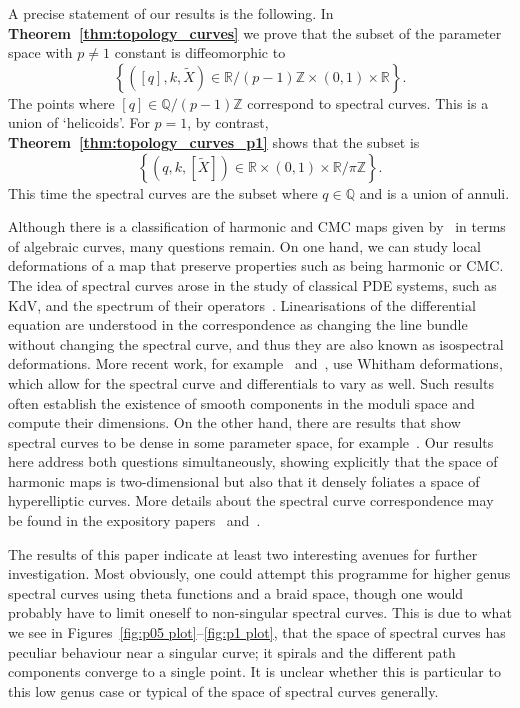 \documentclass{article}
\numberwithin{equation}{section}
\numberwithin{figure}{section}
\newcommand{\bra}[1]{\left(#1\right)}
\newcommand{\Z}{\mathbb{Z}}
\newcommand{\Q}{\mathbb{Q}}
\newcommand{\R}{\mathbb{R}}
\begin{document}
A precise statement of our results is the following. In {\bf Theorem~\ref{thm:topology_curves}} we prove that the subset of the parameter space with $p\neq 1$ constant is diffeomorphic to 
\[
\left\{ \bra{[q],k,\tilde{X}} \in \R/(p-1)\Z \times (0,1) \times \R \right\}.
\]
The points where $[q] \in \Q/(p-1)\Z$ correspond to spectral curves. This is a union of `helicoids'.
For $p=1$, by contrast, {\bf Theorem~\ref{thm:topology_curves_p1}} shows that the subset is 
\[
\left\{ \bra{q,k,\left[\tilde{X}\right]} \in \R \times (0,1) \times \R/\pi\Z \right\}.
\]
This time the spectral curves are the subset where $q\in\Q$ and is a union of annuli.




Although there is a classification of harmonic and CMC maps given by~\cite{Hitchin1990,Pinkall1989,Bobenko1991} in terms of algebraic curves, many questions remain. 
On one hand, we can study local deformations of a map that preserve properties such as being harmonic or CMC. The idea of spectral curves arose in the study of classical PDE systems, such as KdV, and the spectrum of their operators~\cite{Flaschka1980,Krichever1995}. Linearisations of the differential equation are understood in the correspondence as changing the line bundle without changing the spectral curve, and thus they are also known as isospectral deformations. More recent work, for example~\cite{Kilian2010} and~\cite{Carberry2019}, use Whitham deformations, which allow for the spectral curve and differentials to vary as well. Such results often establish the existence of smooth components in the moduli space and compute their dimensions.
On the other hand, there are results that show spectral curves to be dense in some parameter space, for example~\cite{Carberry2016a,Carberry2016}.
Our results here address both questions simultaneously, showing explicitly that the space of harmonic maps is two-dimensional but also that it densely foliates a space of hyperelliptic curves.
More details about the spectral curve correspondence may be found in the expository papers~\cite{McIntosh2008} and~\cite{Carberry2013a}.

The results of this paper indicate at least two interesting avenues for further investigation. Most obviously, one could attempt this programme for higher genus spectral curves using theta functions and a braid space, though one would probably have to limit oneself to non-singular spectral curves. This is due to what we see in Figures~\ref{fig:p05 plot}--\ref{fig:p1 plot}, that the space of spectral curves has peculiar behaviour near a singular curve; it spirals and the different path components converge to a single point. It is unclear whether this is particular to this low genus case or typical of the space of spectral curves generally.
\end{document}
